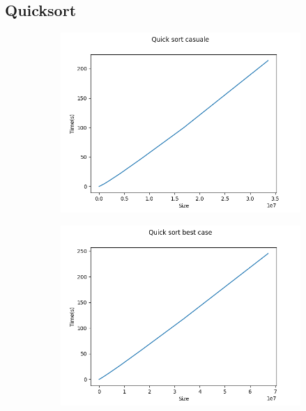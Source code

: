\documentclass[]{article}
\begin{document}
\subsection{Quicksort}
\begin{figure}[H]
    \centering
    \begin{subfigure}[b]{0.4\linewidth} 
        \centering
        \includegraphics[width=\textwidth]{QuickSortCasuale}
        \label{fig:quick_casuale}
    \end{subfigure}
    \quad
    \begin{subfigure}[b]{0.4\linewidth}
        \centering
        \includegraphics[width=\textwidth]{QuickSortBestCase}
        \label{fig:quick_best}
    \end{subfigure}

\end{figure}
\end{document}
